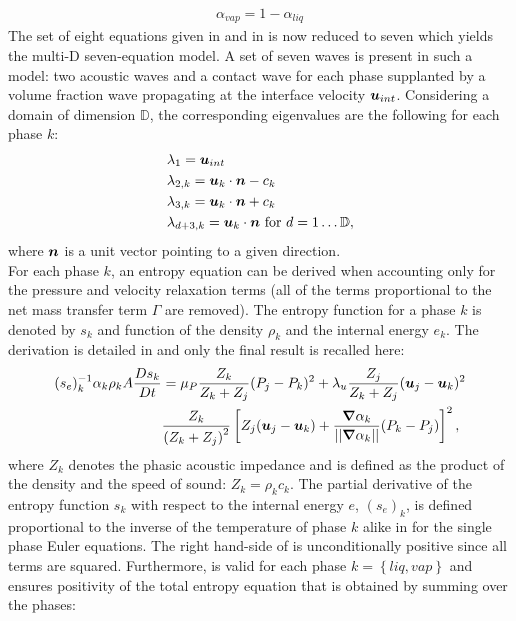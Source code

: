 %
\begin{align}
 \alpha_{vap}= 1 - \alpha_{liq}
\end{align}
%
The set of eight equations given in  and in  is now reduced to seven which yields the multi-D seven-equation model. A set of seven waves is present in such a model: two acoustic waves and a contact wave for each phase supplanted by a volume fraction wave propagating at the interface velocity $\boldsymbol u_{int}$. Considering a domain of dimension $\mathbb{D}$, the corresponding eigenvalues are the following for each phase $k$:
% 
\begin{align}
&\lambda_1 = \boldsymbol u_{int} \nonumber\\
&\lambda_{2,k} = \boldsymbol u_k \cdot \boldsymbol n - c_k \nonumber\\
&\lambda_{3,k} = \boldsymbol u_k \cdot \boldsymbol n + c_k \nonumber\\
&\lambda_{d+3,k} = \boldsymbol u_k \cdot \boldsymbol n \text{ for } d = 1 \dots \mathbb{D},\nonumber
\end{align}
%
where $\boldsymbol n$ is a unit vector pointing to a given direction.  \\
For each phase $k$, an entropy equation can be derived when accounting only for the pressure and velocity relaxation terms (all of the terms proportional to the net mass transfer term $\Gamma$ are removed). The entropy function for a phase $k$ is denoted by $s_k$ and function of the density $\rho_k$ and the internal energy $e_k$. The derivation is detailed in  and only the final result is recalled here:
%
\begin{align}\label{eq:ent-eqn-7-eqn-model}
(s_{e})_k^{-1} \alpha_k \rho_k A \frac{Ds_k}{Dt} &= \mu_P \frac{Z_k}{Z_k+Z_j} (P_j - P_k)^2 + \lambda_u \frac{Z_j}{Z_k+Z_j} (\boldsymbol u_j -\boldsymbol u_k)^2 \nonumber
\\
& \frac{Z_k}{\left( Z_k+Z_j \right)^2} \left[ Z_j (\boldsymbol u_j-\boldsymbol u_k)+\frac{\boldsymbol{\nabla} \alpha_k}{|| \boldsymbol{\nabla} \alpha_k ||}(P_k-P_j)\right]^2,
\end{align}
where $Z_{k}$ denotes the phasic acoustic impedance and is defined as the product of the density and the speed of sound: $Z_k = \rho_k c_k$. The partial derivative of the entropy function $s_k$ with respect to the internal energy $e$, $(s_e)_k$, is defined proportional to the inverse of the temperature of phase $k$ alike in  for the single phase Euler equations. The right hand-side of  is unconditionally positive since all terms are squared. Furthermore,  is valid for each phase $k=\left\{liq, vap \right\}$ and ensures positivity of the total entropy equation that is obtained by summing over the phases:

